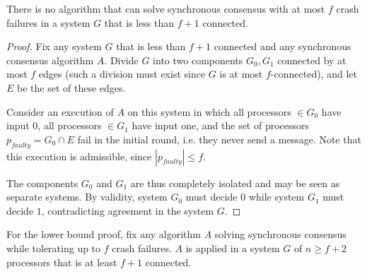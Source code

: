 \begin{theorem}
There is no algorithm that can solve synchronous consensus with at most $f$
crash failures in a system $G$ that is less than $f+1$ connected.
\end{theorem}

\begin{proof}
Fix any system $G$ that is less than $f+1$ connected and any synchronous consensus
algorithm $A$. Divide $G$ into two components $G_0, G_1$ connected by at most $f$
edges (such a division must exist since $G$ is at most $f$-connected), and let
$E$ be the set of these edges.

Consider an execution of $A$ on this system in which all processors $\in G_0$
have input $0$, all processors $\in G_1$ have input one, and the set of processors
$p_{faulty} = G_0 \cap E$ fail in the initial round, i.e. they never send
a message. Note that this execution is admissible, since $|p_{faulty}| \leq f$.

The components $G_0$ and $G_1$ are thus completely isolated and may be seen as
separate systems. By validity, system $G_0$ must decide $0$ while system $G_1$
must decide $1$, contradicting agreement in the system $G$.
\end{proof}

For the lower bound proof, fix any algorithm $A$ solving synchronous consensus
while tolerating up to $f$ crash failures. $A$ is applied in a system $G$ of
$n \geq f+2$ processors that is at least $f+1$ connected.

